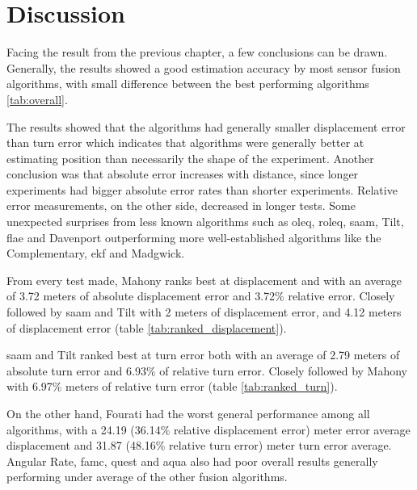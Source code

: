 \section{Discussion}
Facing the result from the previous chapter, a few conclusions can be drawn. Generally, the results showed a good estimation accuracy by most sensor fusion algorithms, with small difference between the best performing algorithms \ref{tab:overall}.



The results showed that the algorithms had generally smaller displacement error than turn error which indicates that algorithms were generally better at estimating position than necessarily the shape of the experiment. Another conclusion was that absolute error increases with distance, since longer experiments had bigger absolute error rates than shorter experiments. Relative error measurements, on the other side, decreased in longer tests. Some unexpected surprises from less known algorithms such as \acrshort{oleq}, \acrshort{roleq}, \acrshort{saam}, Tilt, \acrshort{flae} and Davenport outperforming more well-established algorithms like the Complementary, \acrshort{ekf} and Madgwick.

From every test made, Mahony ranks best at displacement and with an average of 3.72 meters of absolute displacement error and 3.72\% relative error. Closely followed by \acrshort{saam} and Tilt with 2 meters of displacement error, and 4.12 meters of displacement error (table \ref{tab:ranked_displacement}).



\acrshort{saam} and Tilt ranked best at turn error both with an average of 2.79 meters of absolute turn error and 6.93\% of relative turn error. Closely followed by Mahony with 6.97\% meters of relative turn error (table \ref{tab:ranked_turn}).



On the other hand, Fourati had the worst general performance among all algorithms, with a 24.19 (36.14\% relative displacement error) meter error average displacement and 31.87 (48.16\% relative turn error) meter turn error average. Angular Rate, \acrshort{famc}, \acrshort{quest} and \acrshort{aqua} also had poor overall results generally performing under average of the other fusion algorithms.

